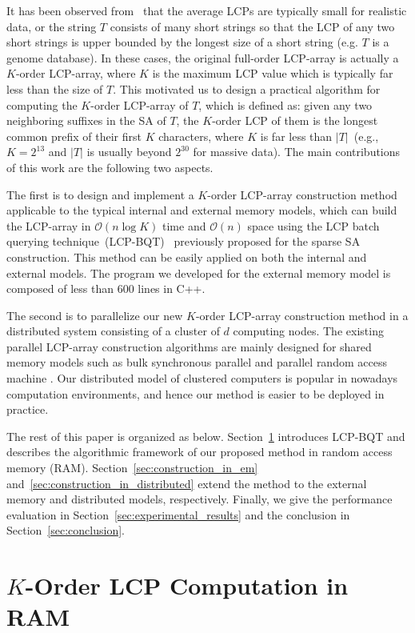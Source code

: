 \documentclass[10pt,journal,letterpaper,compsoc]{IEEEtran}
\begin{document}
\begin{CJK*}{GBK}{song}
It has been observed from~\cite{Felipe2013} that the average LCPs are typically small for realistic data, or the string $T$ consists of many short strings so that the LCP of any two short strings is upper bounded by the longest size of a short string (e.g. $T$ is a genome database). In these cases, the original full-order LCP-array is actually a $K$-order LCP-array, where $K$ is the maximum LCP value which is typically far less than the size of $T$.
This motivated us to design a practical algorithm for computing the $K$-order LCP-array of $T$, which is defined as: given any two neighboring suffixes in the SA of $T$, the $K$-order LCP of them is the longest common prefix of their first $K$ characters, where $K$ is far less than $|T|$~(e.g., $K=2 ^{13}$ and $|T|$ is usually beyond $2^{30}$ for massive data). The main contributions of this work are the following two aspects.

The first is to design and implement a $K$-order LCP-array construction method applicable to the typical internal and external memory models, which can build the LCP-array in $\mathcal{O}(n\log K)$ time and $\mathcal{O}(n)$ space using the LCP batch querying technique~(LCP-BQT)~\cite{Philip2013} previously proposed for the sparse SA construction. This method can be easily applied on both the internal and external models. The program we developed for the external memory model is composed of less than 600 lines in C++.

The second is to parallelize our new $K$-order LCP-array construction method in a distributed system consisting of a cluster of $d$ computing nodes. The existing parallel LCP-array construction algorithms are mainly designed for shared memory models such as bulk synchronous parallel and parallel random access machine \cite{Shun2014,Deo2013}. Our distributed model of clustered computers is popular in nowadays computation environments, and hence our method is easier to be deployed in practice.

The rest of this paper is organized as below. Section~\ref{sec:construction_in_ram} introduces LCP-BQT and describes the algorithmic framework of our proposed method in random access memory (RAM). Section~\ref{sec:construction_in_em} and~\ref{sec:construction_in_distributed} extend the method to the external memory and distributed models, respectively. Finally, we give the performance evaluation in Section~\ref{sec:experimental_results} and the conclusion in Section~\ref{sec:conclusion}.

\section{$K$-Order LCP Computation in RAM}\label{sec:construction_in_ram}


\end{CJK*}
\end{document}
